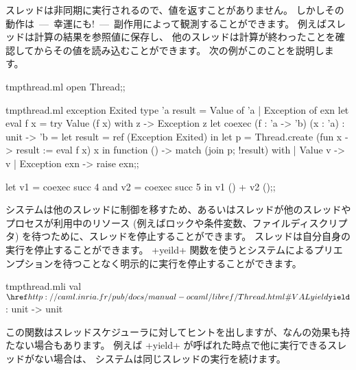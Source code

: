 スレッドは非同期に実行されるので、値を返すことがありません。
しかしその動作は~---~幸運にも!~---~副作用によって観測することができます。
例えばスレッドは計算の結果を参照値に保存し、
他のスレッドは計算が終わったことを確認してからその値を読み込むことができます。
次の例がこのことを説明します。
%
\begin{codefile}{tmpthread.ml}
open Thread;;
\end{codefile}
\begin{listingcodefile}{tmpthread.ml}
exception Exited
type 'a result = Value of 'a | Exception of exn
let eval f x = try Value (f x) with z -> Exception z
let coexec (f : 'a -> 'b) (x : 'a) : unit -> 'b =
  let result = ref (Exception Exited) in
  let p = Thread.create (fun x -> result := eval f x) x in
  function () -> match (join p; !result) with
    | Value v -> v
    | Exception exn -> raise exn;;

let v1 = coexec succ 4 and v2 = coexec succ 5 in v1 () + v2 ();;
\end{listingcodefile}

システムは他のスレッドに制御を移すため、あるいはスレッドが他のスレッドやプロセスが利用中のリソース
(例えばロックや条件変数、ファイルディスクリプタ) を待つために、スレッドを停止することができます。
スレッドは自分自身の実行を停止することができます。
\ml+yeild+ 関数を使うとシステムによるプリエンプションを待つことなく明示的に実行を停止することができます。
%
\begin{listingcodefile}{tmpthread.mli}
val $\indexlibvalue{Thread}{yield}$ : unit -> unit
\end{listingcodefile}
%
この関数はスレッドスケジューラに対してヒントを出しますが、なんの効果も持たない場合もあります。
例えば \ml+yield+ が呼ばれた時点で他に実行できるスレッドがない場合は、
システムは同じスレッドの実行を続けます。


